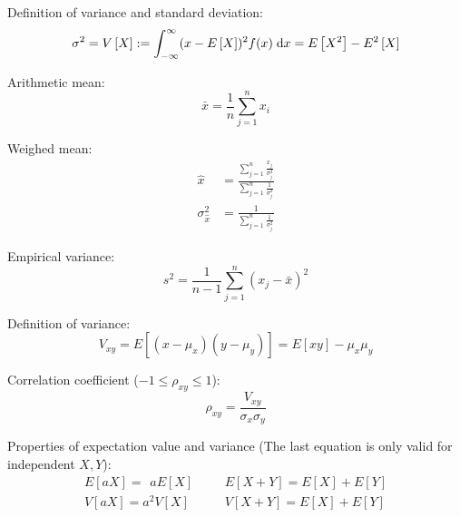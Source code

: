 			\noindent
			Definition of variance and standard deviation:
			\begin{equation}
				\sigma^2 = V\left[ X \right] := \int_{-\infty}^{\infty} (x-E\left[X\right])^2f(x)\;\mathrm{d} x = E\left[X^2\right]-E^2\left[X\right]
			\end{equation}

			\noindent
			Arithmetic mean:
			\begin{equation}
				\bar{x}=\frac{1}{n}\sum_{j=1}^n x_i
			\end{equation}

			\noindent
			Weighed mean:
			\begin{equation}
				\begin{aligned}
					\hat{x} &= \frac{\sum_{j=1}^n \frac{x_j}{\sigma_j^2}}{\sum_{j=1}^n \frac{1}{\sigma_j^2}} \\
					\sigma_{\hat{x}}^2 &= \frac{1}{\sum_{j=1}^n \frac{1}{\sigma_j^2}}
				\end{aligned}
			\end{equation}

			\noindent
			Empirical variance:
			\begin{equation}
				s^2 = \frac{1}{n-1}\sum_{j=1}^n (x_j-\bar{x})^2
			\end{equation}

			\noindent
			Definition of variance:
			\begin{equation}
				V_{xy} = E\left[(x-\mu_x)(y-\mu_y)\right] = E\left[xy\right]-\mu_x\mu_y
			\end{equation}

			\noindent
			Correlation coefficient ($-1\le\rho_{xy}\le 1$):
			\begin{equation}
				\rho_{xy} = \frac{V_{xy}}{\sigma_x\sigma_y}
			\end{equation}

			\noindent
			Properties of expectation value and variance (The last equation is only valid for independent $X, Y$):
			\begin{equation}
				\begin{array}{rl}
					E\left[aX\right] = \phantom{^2}a E\left[X\right]
					&\hspace{20pt}
					E\left[X+Y\right] = E\left[X\right] + E\left[Y\right]
					\\
					V\left[aX\right] = a^2 V\left[X\right]
					&\hspace{20pt}
					V\left[X+Y\right] = E\left[X\right] + E\left[Y\right]
					\\
				\end{array}
			\end{equation}

